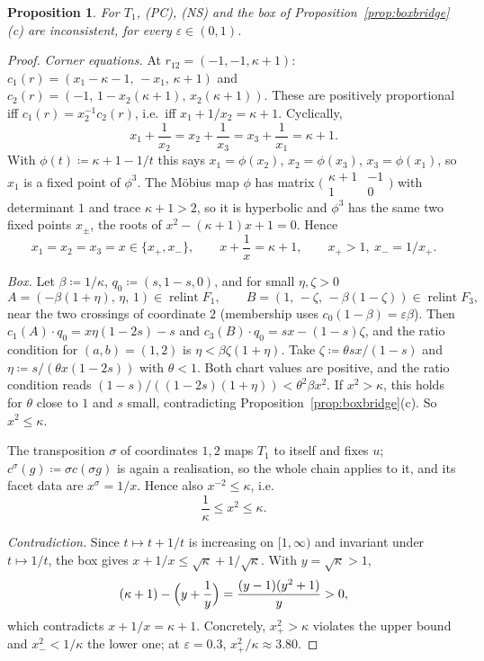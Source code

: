 \documentclass[11pt]{article}
\newtheorem{proposition}[theorem]{Proposition}
\theoremstyle{definition}
\theoremstyle{remark}
\newcommand{\relint}{\operatorname{relint}}
\begin{document}
\begin{proposition}\label{prop:T1}
For $T_1$, (PC), (NS) and the box of Proposition~\ref{prop:boxbridge}(c) are inconsistent, for every $\varepsilon\in(0,1)$.
\end{proposition}
\begin{proof}
\emph{Corner equations.} At $r_{12}=(-1,-1,\kappa+1)$: $c_1(r)=(x_1-\kappa-1,\,-x_1,\,\kappa+1)$ and $c_2(r)=(-1,\,1-x_2(\kappa+1),\,x_2(\kappa+1))$. These are positively proportional iff $c_1(r)=x_2^{-1}c_2(r)$, i.e.\ iff $x_1+1/x_2=\kappa+1$. Cyclically,
\begin{equation}\label{eq:corner}
x_1+\frac1{x_2}=x_2+\frac1{x_3}=x_3+\frac1{x_1}=\kappa+1 .
\end{equation}
With $\phi(t)\coloneqq\kappa+1-1/t$ this says $x_1=\phi(x_2)$, $x_2=\phi(x_3)$, $x_3=\phi(x_1)$, so $x_1$ is a fixed point of $\phi^3$. The M\"obius map $\phi$ has matrix $\bigl(\begin{smallmatrix}\kappa+1&-1\\1&0\end{smallmatrix}\bigr)$ with determinant $1$ and trace $\kappa+1>2$, so it is hyperbolic and $\phi^3$ has the same two fixed points $x_\pm$, the roots of $x^2-(\kappa+1)x+1=0$. Hence
\[
x_1=x_2=x_3=x\in\{x_+,x_-\},\qquad x+\frac1x=\kappa+1,\qquad x_+>1,\ x_-=1/x_+ .
\]

\emph{Box.} Let $\beta\coloneqq1/\kappa$, $q_0\coloneqq(s,1-s,0)$, and for small $\eta,\zeta>0$
\[
A=(-\beta(1+\eta),\,\eta,\,1)\in\relint F_1,\qquad B=(1,\,-\zeta,\,-\beta(1-\zeta))\in\relint F_3 ,
\]
near the two crossings of coordinate $2$ (membership uses $c_0(1-\beta)=\varepsilon\beta$). Then $c_1(A)\cdot q_0=x\eta(1-2s)-s$ and $c_3(B)\cdot q_0=sx-(1-s)\zeta$, and the ratio condition for $(a,b)=(1,2)$ is $\eta<\beta\zeta(1+\eta)$. Take $\zeta\coloneqq\theta sx/(1-s)$ and $\eta\coloneqq s/(\theta x(1-2s))$ with $\theta<1$. Both chart values are positive, and the ratio condition reads $(1-s)/((1-2s)(1+\eta))<\theta^2\beta x^2$. If $x^2>\kappa$, this holds for $\theta$ close to $1$ and $s$ small, contradicting Proposition~\ref{prop:boxbridge}(c). So $x^2\le\kappa$.

The transposition $\sigma$ of coordinates $1,2$ maps $T_1$ to itself and fixes $u$; $c^\sigma(g)\coloneqq\sigma c(\sigma g)$ is again a realisation, so the whole chain applies to it, and its facet data are $x^\sigma=1/x$. Hence also $x^{-2}\le\kappa$, i.e.
\[
\frac1\kappa\le x^2\le\kappa .
\]

\emph{Contradiction.} Since $t\mapsto t+1/t$ is increasing on $[1,\infty)$ and invariant under $t\mapsto1/t$, the box gives $x+1/x\le\sqrt\kappa+1/\sqrt\kappa$. With $y=\sqrt\kappa>1$,
\[
(\kappa+1)-\Bigl(y+\frac1y\Bigr)=\frac{(y-1)(y^2+1)}{y}>0,
\]
which contradicts $x+1/x=\kappa+1$. Concretely, $x_+^2>\kappa$ violates the upper bound and $x_-^2<1/\kappa$ the lower one; at $\varepsilon=0.3$, $x_+^2/\kappa\approx3.80$.
\end{proof}
\end{document}

